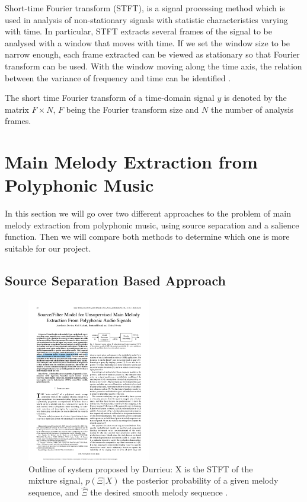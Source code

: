 Short-time Fourier transform (STFT), is a signal processing method which is used in analysis of non-stationary signals with statistic characteristics varying with time.
In particular, STFT extracts several frames of the signal to be analysed with a window that moves with time. If we set the window size to be narrow enough, each frame extracted can be viewed as stationary so that Fourier transform can be used. With the window moving along the time axis, the relation between the variance of frequency and time can be identified \cite{STFT}.

The short time Fourier transform of a time-domain signal $y$ is denoted by the matrix $F \times N$, $F$ being the Fourier transform size and $N$ the number of analysis frames.

\vspace{20pt}

\section{Main Melody Extraction from Polyphonic Music}
In this section we will go over two different approaches to the problem of main melody extraction from polyphonic music, using source separation and a salience function. Then we will compare both methods to determine which one is more suitable for our project.

\vspace{10pt}

\subsection{Source Separation Based Approach}

\begin{figure}
  \vspace{-50pt}

  \begin{center}
    \includegraphics[width=0.48\textwidth]{Figures/durrieudiagram}
  \end{center}
  \caption{Outline of system proposed by Durrieu: X is the STFT of the mixture signal, $p(\Xi|X)$ the posterior probability of a given melody sequence, and $\hat{\Xi} $ the desired smooth melody sequence \cite{durrieu}.}
  \label{fig:durrieu}
\end{figure}


